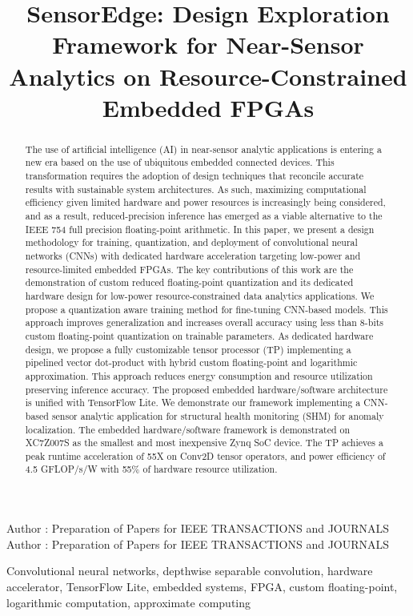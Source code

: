 \title {SensorEdge: Design Exploration Framework for Near-Sensor Analytics on Resource-Constrained Embedded FPGAs}



\markboth
{Author \headeretal: Preparation of Papers for IEEE TRANSACTIONS and JOURNALS}
{Author \headeretal: Preparation of Papers for IEEE TRANSACTIONS and JOURNALS}


\begin{abstract}
The use of artificial intelligence (AI) in near-sensor analytic applications is entering a new era based on the use of ubiquitous embedded connected devices. This transformation requires the adoption of design techniques that reconcile accurate results with sustainable system architectures. As such, maximizing computational efficiency given limited hardware and power resources is increasingly being considered, and as a result, reduced-precision inference has emerged as a viable alternative to the IEEE 754 full precision floating-point arithmetic. In this paper, we present a design methodology for training, quantization, and deployment of convolutional neural networks (CNNs) with dedicated hardware acceleration targeting low-power and resource-limited embedded FPGAs. The key contributions of this work are the demonstration of custom reduced floating-point quantization and its dedicated hardware design for low-power resource-constrained data analytics applications. We propose a quantization aware training method for fine-tuning CNN-based models. This approach improves generalization and increases overall accuracy using less than 8-bits custom floating-point quantization on trainable parameters. As dedicated hardware design, we propose a fully customizable tensor processor (TP) implementing a pipelined vector dot-product with hybrid custom floating-point and logarithmic approximation. This approach reduces energy consumption and resource utilization preserving inference accuracy. The proposed embedded hardware/software architecture is unified with TensorFlow Lite. We demonstrate our framework implementing a CNN-based sensor analytic application for structural health monitoring (SHM) for anomaly localization. The embedded hardware/software framework is demonstrated on XC7Z007S as the smallest and most inexpensive Zynq SoC device. The TP achieves a peak runtime acceleration of 55X on Conv2D tensor operators, and power efficiency of 4.5 GFLOP/s/W with 55\% of hardware resource utilization.
\end{abstract}

\begin{keywords}
Convolutional neural networks, depthwise separable convolution, hardware accelerator, TensorFlow Lite, embedded systems, FPGA, custom floating-point, logarithmic computation, approximate computing
\end{keywords}

\titlepgskip=-15pt

\maketitle